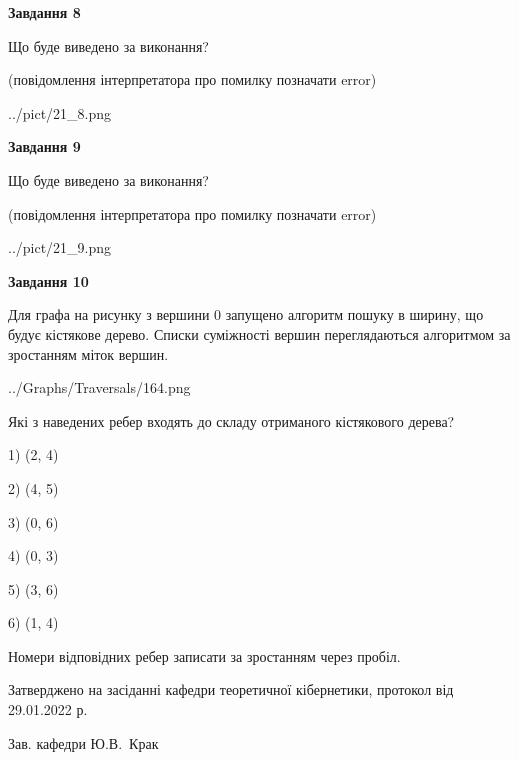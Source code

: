 \documentclass[12pt, ukrainian]{article}
\begin{document}
{\begin {large}
{\begin {center}\textbf{Завдання 8}\end {center}}\par
Що буде виведено за виконання?\par
 (повідомлення інтерпретатора про помилку позначати error)\par
\begin{center}
	{../pict/21_8.png}
\end{center}
\newpage

{\begin {center}\textbf{Завдання 9}\end {center}}\par
Що буде виведено за виконання?\par
 (повідомлення інтерпретатора про помилку позначати error)\par
\begin{center}
	{../pict/21_9.png}
\end{center}
\newpage

{\begin {center}\textbf{Завдання 10}\end {center}}\par
Для графа на рисунку з вершини 0 запущено алгоритм пошуку в ширину, що будує кістякове дерево. Списки суміжності вершин переглядаються алгоритмом за зростанням міток вершин.\par
\begin{center}
	{../Graphs/Traversals/164.png}
\end{center}
\par Які з наведених ребер входять до складу отриманого кістякового дерева?\par
1) (2, 4)\par
2) (4, 5)\par
3) (0, 6)\par
4) (0, 3)\par
5) (3, 6)\par
6) (1, 4)\par
{\vskip 15pt} Номери відповідних ребер записати за зростанням через пробіл.\par
\newpage


\end {large}
}
{\smallskip \begin {small} Затверджено на засіданні кафедри теоретичної кібернетики, протокол  від   29.01.2022 р.\par\smallskip\smallskip
{\parbox {6.5 cm}{Зав. кафедри \dotfill Ю.В.~Крак}} \end{small}}
\end{document}
